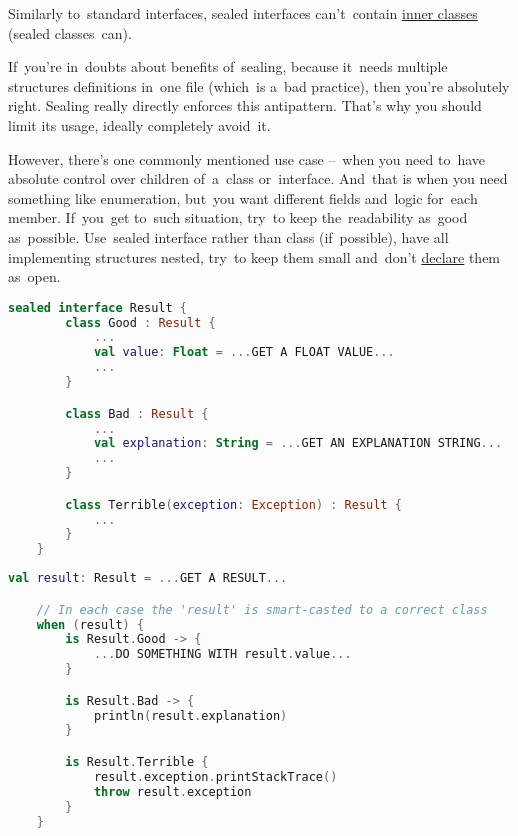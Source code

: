 \warning Similarly to~standard interfaces, sealed interfaces can't~contain \hyperref[kotlininnerclass]{inner classes} (sealed classes~can).

If~you're in~doubts about benefits of~sealing, because it~needs multiple structures definitions in~one file (which~is a~bad practice), then you're absolutely right.
Sealing really directly enforces this antipattern.
That's why you should limit its usage, ideally completely avoid~it.

However, there's one commonly mentioned use case --~when you need to~have absolute control over children of~a~class or~interface.
And~that is when you need something like enumeration, but~you want different fields and~logic for~each member.
If~you~get to~such situation, try~to keep the~readability as~good as~possible.
Use~sealed interface rather than class (if~possible), have all implementing structures nested, try~to keep them small and~don't \hyperref[declarationdefinition]{declare} them as~open.
\newpage

\example
\begin{lstlisting}[language=Kotlin, title={Sealed interface representing a~result}]
    sealed interface Result {
        class Good : Result {
            ...
            val value: Float = ...GET A FLOAT VALUE...
            ...
        }

        class Bad : Result {
            ...
            val explanation: String = ...GET AN EXPLANATION STRING...
            ...
        }

        class Terrible(exception: Exception) : Result {
            ...
        }
    }
\end{lstlisting}
\begin{lstlisting}[language=Kotlin, title={Usage}]
    val result: Result = ...GET A RESULT...

    // In each case the 'result' is smart-casted to a correct class
    when (result) {
        is Result.Good -> {
            ...DO SOMETHING WITH result.value...
        }

        is Result.Bad -> {
            println(result.explanation)
        }

        is Result.Terrible {
            result.exception.printStackTrace()
            throw result.exception
        }
    }
\end{lstlisting}
\newpage

